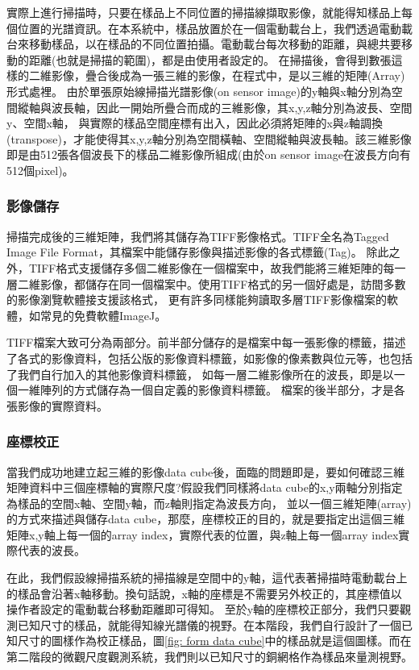 \documentclass[12pt]{article}
\begin{document}
實際上進行掃描時，只要在樣品上不同位置的掃描線擷取影像，就能得知樣品上每個位置的光譜資訊。在本系統中，樣品放置於在一個電動載台上，我們透過電動載台來移動樣品，以在樣品的不同位置拍攝。電動載台每次移動的距離，與總共要移動的距離(也就是掃描的範圍)，都是由使用者設定的。
在掃描後，會得到數張這樣的二維影像，疊合後成為一張三維的影像，在程式中，是以三維的矩陣(Array)形式處裡。
由於單張原始線掃描光譜影像(on sensor image)的y軸與x軸分別為空間縱軸與波長軸，因此一開始所疊合而成的三維影像，其x,y,z軸分別為波長、空間y、空間x軸，
與實際的樣品空間座標有出入，因此必須將矩陣的x與z軸調換(transpose)，才能使得其x,y,z軸分別為空間橫軸、空間縱軸與波長軸。該三維影像即是由512張各個波長下的樣品二維影像所組成(由於on sensor image在波長方向有512個pixel)。

\subsubsection{影像儲存}\label{section: saveTiff}
掃描完成後的三維矩陣，我們將其儲存為TIFF影像格式。TIFF全名為Tagged Image File Format，其檔案中能儲存影像與描述影像的各式標籤(Tag)。
除此之外，TIFF格式支援儲存多個二維影像在一個檔案中，故我們能將三維矩陣的每一層二維影像，都儲存在同一個檔案中。使用TIFF格式的另一個好處是，訪間多數的影像瀏覽軟體接支援該格式，
更有許多同樣能夠讀取多層TIFF影像檔案的軟體，如常見的免費軟體ImageJ。

TIFF檔案大致可分為兩部分。前半部分儲存的是檔案中每一張影像的標籤，描述了各式的影像資料，包括公版的影像資料標籤，如影像的像素數與位元等，也包括了我們自行加入的其他影像資料標籤，
如每一層二維影像所在的波長，即是以一個一維陣列的方式儲存為一個自定義的影像資料標籤。
檔案的後半部分，才是各張影像的實際資料。

\subsubsection{座標校正}
當我們成功地建立起三維的影像data cube後，面臨的問題即是，要如何確認三維矩陣資料中三個座標軸的實際尺度?假設我們同樣將data cube的x,y兩軸分別指定為樣品的空間x軸、空間y軸，而z軸則指定為波長方向，
並以一個三維矩陣(array)的方式來描述與儲存data cube，那麼，座標校正的目的，就是要指定出這個三維矩陣x,y軸上每一個的array index，實際代表的位置，與z軸上每一個array index實際代表的波長。

在此，我們假設線掃描系統的掃描線是空間中的y軸，這代表著掃描時電動載台上的樣品會沿著x軸移動。換句話說，x軸的座標是不需要另外校正的，其座標值以操作者設定的電動載台移動距離即可得知。
至於y軸的座標校正部分，我們只要觀測已知尺寸的樣品，就能得知線光譜儀的視野。在本階段，我們自行設計了一個已知尺寸的圖樣作為校正樣品，圖\ref{fig: form data cube}中的樣品就是這個圖樣。而在第二階段的微觀尺度觀測系統，我們則以已知尺寸的銅網格作為樣品來量測視野。
\end{document}
